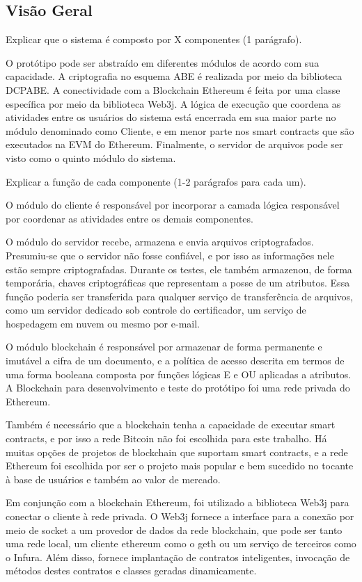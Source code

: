 \documentclass[a4paper,11pt]{article}
\begin{document}
\subsection{Visão Geral}
\label{sec:visaogeral}

{\color{ForestGreen}Explicar que o sistema é composto por X componentes (1 parágrafo).}

O protótipo pode ser abstraído em diferentes módulos de acordo com sua capacidade. A criptografia no esquema ABE é realizada por meio da biblioteca DCPABE. A conectividade com a Blockchain Ethereum é feita por uma classe específica por meio da biblioteca Web3j. A lógica de execução que coordena as atividades entre os usuários do sistema está encerrada em sua maior parte no módulo denominado como Cliente, e em menor parte nos smart contracts que são executados na EVM do Ethereum. Finalmente, o servidor de arquivos pode ser visto como o quinto módulo do sistema.

{\color{ForestGreen}Explicar a função de cada componente (1-2 parágrafos para cada um).}

O módulo do cliente é responsável por incorporar a camada lógica responsável por coordenar as atividades entre os demais componentes.

O módulo do servidor recebe, armazena e envia arquivos criptografados. Presumiu-se que o servidor não fosse confiável, e por isso as informações nele estão sempre criptografadas. Durante os testes, ele também armazenou, de forma temporária, chaves criptográficas que representam a posse de um atributos. Essa função poderia ser transferida para qualquer serviço de transferência de arquivos, como um servidor dedicado sob controle do certificador, um serviço de hospedagem em nuvem ou mesmo por e-mail.

O módulo blockchain é responsável por armazenar de forma permanente e imutável a cifra de um documento, e a política de acesso descrita em termos de uma forma booleana composta por funções lógicas E e OU aplicadas a atributos. A Blockchain para desenvolvimento e teste do protótipo foi uma rede privada do Ethereum.

Também é necessário que a blockchain tenha a capacidade de executar smart contracts, e por isso a rede Bitcoin não foi escolhida para este trabalho. Há muitas opções de projetos de blockchain que suportam smart contracts, e a rede Ethereum foi escolhida por ser o projeto mais popular e bem sucedido no tocante à base de usuários e também ao valor de mercado.

Em conjunção com a blockchain Ethereum, foi utilizado a biblioteca Web3j para conectar o cliente à rede privada. O Web3j fornece a interface para a conexão por meio de socket a um provedor de dados da rede blockchain, que pode ser tanto uma rede local, um cliente ethereum como o geth ou um serviço de terceiros como o Infura. Além disso, fornece implantação de contratos inteligentes, invocação de métodos destes contratos e classes geradas dinamicamente.
\end{document}

